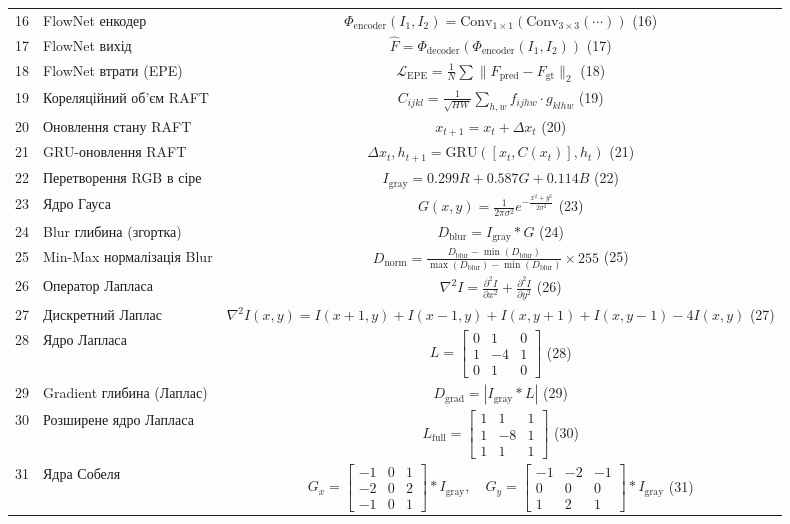 \documentclass[14pt, a4paper]{extarticle}
\numberwithin{equation}{section}
\begin{document}
\begin{longtable}{|c|p{10cm}|c|}
16 & FlowNet енкодер & $\Phi_{\text{encoder}}(I_1,I_2) = \text{Conv}_{1\times1}(\text{Conv}_{3\times3}(\cdots))$ \hfill (16) \\
17 & FlowNet вихід & $\hat{F} = \Phi_{\text{decoder}}(\Phi_{\text{encoder}}(I_1,I_2))$ \hfill (17) \\
18 & FlowNet втрати (EPE) & $\mathcal{L}_{\text{EPE}} = \frac{1}{N} \sum \|F_{\text{pred}} - F_{\text{gt}}\|_2$ \hfill (18) \\
19 & Кореляційний об'єм RAFT & $C_{ijkl} = \frac{1}{\sqrt{HW}} \sum_{h,w} f_{ijhw} \cdot g_{klhw}$ \hfill (19) \\
20 & Оновлення стану RAFT & $x_{t+1} = x_t + \Delta x_t$ \hfill (20) \\
21 & GRU-оновлення RAFT & $\Delta x_t, h_{t+1} = \text{GRU}([x_t, C(x_t)], h_t)$ \hfill (21) \\
22 & Перетворення RGB в сіре & $I_{\text{gray}} = 0.299R + 0.587G + 0.114B$ \hfill (22) \\
23 & Ядро Гауса & $G(x,y) = \frac{1}{2\pi\sigma^2} e^{-\frac{x^2+y^2}{2\sigma^2}}$ \hfill (23) \\
24 & Blur глибина (згортка) & $D_{\text{blur}} = I_{\text{gray}} * G$ \hfill (24) \\
25 & Min-Max нормалізація Blur & $D_{\text{norm}} = \frac{D_{\text{blur}} - \min(D_{\text{blur}})}{\max(D_{\text{blur}}) - \min(D_{\text{blur}})} \times 255$ \hfill (25) \\
26 & Оператор Лапласа & $\nabla^2 I = \frac{\partial^2 I}{\partial x^2} + \frac{\partial^2 I}{\partial y^2}$ \hfill (26) \\
27 & Дискретний Лаплас & $\nabla^2 I(x,y) = I(x+1,y)+I(x-1,y)+I(x,y+1)+I(x,y-1)-4I(x,y)$ \hfill (27) \\
28 & Ядро Лапласа & $L = \begin{bmatrix}0&1&0\\1&-4&1\\0&1&0\end{bmatrix}$ \hfill (28) \\
29 & Gradient глибина (Лаплас) & $D_{\text{grad}} = |I_{\text{gray}} * L|$ \hfill (29) \\
30 & Розширене ядро Лапласа & $L_{\text{full}} = \begin{bmatrix}1&1&1\\1&-8&1\\1&1&1\end{bmatrix}$ \hfill (30) \\
31 & Ядра Собеля & $G_x = \begin{bmatrix}-1&0&1\\-2&0&2\\-1&0&1\end{bmatrix} * I_{\text{gray}}, \quad G_y = \begin{bmatrix}-1&-2&-1\\0&0&0\\1&2&1\end{bmatrix} * I_{\text{gray}}$ \hfill (31) \\

\end{longtable}
\end{document}
